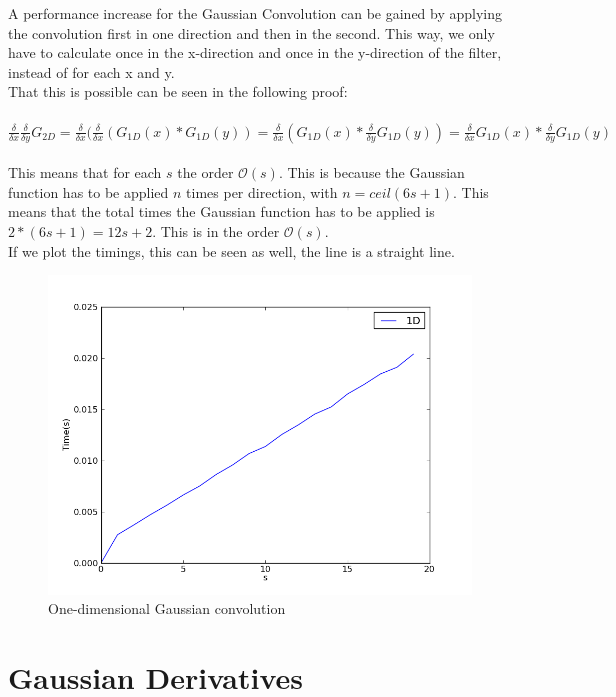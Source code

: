 \documentclass[10pt,a4paper]{article}
\begin{document}
A performance increase for the Gaussian Convolution can be gained by
applying the convolution first in one direction and then in the
second. This way, we only have to calculate once in the x-direction and
once in the y-direction of the filter, instead of for each x and y.\\
That this is possible can be seen in the following proof:\\
\\
$\frac{\delta}{\delta x}\frac{\delta}{\delta y}G_{2D} 
= \frac{\delta}{\delta x}(\frac{\delta}{\delta x}(G_{1D}(x) * G_{1D}(y)) 
= \frac{\delta}{\delta x}(G_{1D}(x) * \frac{\delta}{\delta y}G_{1D}(y))
= \frac{\delta}{\delta x}G_{1D}(x) * \frac{\delta}{\delta y}G_{1D}(y)$\\
\\
This means that for each $s$ the order $\mathcal{O}(s)$. This is because
the Gaussian function has to be applied $n$ times per direction, with
$n = ceil(6s + 1)$. This means that the total times the Gaussian function
has to be applied is $2 * (6s + 1) = 12s + 2$. This is in the order 
$\mathcal{O}(s)$.\\
If we plot the timings, this can be seen as well, the line is a straight
line.
\begin{figure}[H]
	\includegraphics[scale=0.5]{1d.png}
	\caption{One-dimensional Gaussian convolution}
\end{figure}

\section{Gaussian Derivatives}
\end{document}
